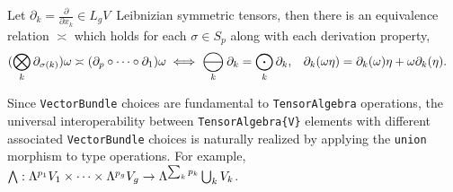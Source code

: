 \documentclass[]{article}
\DeclareMathOperator*{\bigominus}{\scalerel*{\ominus}{\bigodot}}
\begin{document}
\begin{definition}
	Let $\partial_k = \frac\partial{\partial x_k}\in L_gV\,$ Leibnizian symmetric tensors, then there is an equivalence relation $\asymp$ which holds for each $\sigma\in S_p$ along with each derivation property,
	\begin{align*}
		(\bigotimes_k \partial_{\sigma(k)})\omega &\asymp (\partial_p \circ \dots\circ  \partial_1)\omega \iff \bigominus_k\partial_k = \bigodot_k\partial_k, & \partial_k(\omega\eta) &= \partial_k(\omega)\eta + \omega\partial_k(\eta).
	\end{align*}
\end{definition}	




Since \verb`VectorBundle` choices are fundamental to \verb`TensorAlgebra` operations, the universal interoperability between \verb`TensorAlgebra{V}` elements with different associated \verb`VectorBundle` choices is naturally realized by applying the \verb`union` morphism to type operations.
For example, $\bigwedge :\Lambda^{p_1}V_1\times\dots\times\Lambda^{p_g}V_g \rightarrow \Lambda^{\sum_kp_k}\bigcup_k V_k$. 
\end{document}

